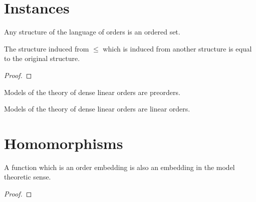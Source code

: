 \section{Instances}

\begin{definition}
    \label{def:le-instance-language-order}
    \leanok
    Any structure of the language of orders is an ordered set.
\end{definition}

\begin{lemma}
    \label{lem:order-structure-of-le}
    \leanok
    The structure induced from $\le$ which is induced from another structure is equal to the original structure.
\end{lemma}
\begin{proof}
    \leanok
\end{proof}

\begin{definition}
    \label{def:preorder-dlo}
    \leanok
    Models of the theory of dense linear orders are preorders.
\end{definition}

\begin{definition}
    \label{def:linearorder-dlo}
    \leanok
    Models of the theory of dense linear orders are linear orders.
\end{definition}


\section{Homomorphisms}

\begin{lemma}
    \label{lem:to-embedding}
    \leanok
    A function which is an order embedding is also an embedding in the model theoretic sense.
\end{lemma}
\begin{proof}
    \leanok
\end{proof}

